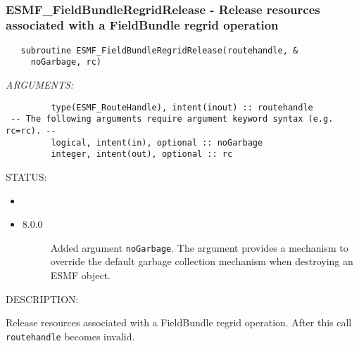  
\mbox{}\hrulefill\ 
 
\subsubsection [ESMF\_FieldBundleRegridRelease] {ESMF\_FieldBundleRegridRelease - Release resources associated with a FieldBundle regrid operation}


  
\begin{verbatim}   subroutine ESMF_FieldBundleRegridRelease(routehandle, &
     noGarbage, rc)\end{verbatim}{\em ARGUMENTS:}
\begin{verbatim}         type(ESMF_RouteHandle), intent(inout) :: routehandle
 -- The following arguments require argument keyword syntax (e.g. rc=rc). --
         logical, intent(in), optional :: noGarbage
         integer, intent(out), optional :: rc\end{verbatim}
{\sf STATUS:}
   \begin{itemize}
   \item{}
   \item{}
   \begin{description}
   \item[8.0.0] Added argument {\tt noGarbage}.
   The argument provides a mechanism to override the default garbage collection
   mechanism when destroying an ESMF object.
   \end{description}
   \end{itemize}
  
{\sf DESCRIPTION:\\ }


   Release resources associated with a FieldBundle regrid operation. After this call
   {\tt routehandle} becomes invalid.
  
